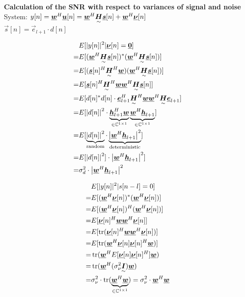 \begin{doublespace}
\textbf{Calculation of the SNR with respect to variances of signal and noise}\\
System: $y[n]=\vec{w}^H\vec{u}[n]=\vec{w}^H\ma{H}\vec{s}[n]+\vec{w}^H\vec{\nu}[n]$\\
\with $\vec{s}[n]=\vec{e}_{l+1}\cdot d[n]$

\parbox{0.5\textwidth}{
\begin{align*}
&E[|y[n]|^2|\vec{\nu}[n]=\vec{0}]\\
=& E[(\vec{w}^H\ma{H}\vec{s}[n])^*(\vec{w}^H\ma{H}\vec{s}[n])]\\
=& E[(\vec{s}[n]^H\ma{H}^H\vec{w})(\vec{w}^H\ma{H}\vec{s}[n])]\\
=& E[\vec{s}[n]^H\ma{H}^H\vec{w}\vec{w}^H\ma{H}\vec{s}[n]]\\
=&E[d[n]^*d[n]\cdot\vec{e}_{l+1}^H\ma{H}^H\vec{w}\vec{w}^H\ma{H}\vec{e}_{l+1}]\\
=&E[\abs{d[n]}^2\cdot\underbrace{\vec{h}_{l+1}^H\vec{w}}_{\in\mathbb{C}^{1\times 1}}\underbrace{\vec{w}^H\vec{h}_{l+1}}_{\in\mathbb{C}^{1\times 1}}]\\
=& E[\underbrace{\abs{d[n]}^2}_{\text{random}}\cdot\underbrace{\abs{\vec{w}^H\vec{h}_{l+1}}^2}_{\text{deterministic}}]\\
=& E[\abs{d[n]}^2]\cdot\abs{\vec{w}^H\vec{h}_{l+1}}^2]\\
=& \sigma_d^2\cdot\abs{\vec{w}^H\vec{h}_{l+1}}^2\\
\end{align*}
}
\parbox{0.5\textwidth}{
\begin{align*}
&E[|y[n]|^2|s[n-l]=0]\\
=&E[(\vec{w}^H\vec{\nu}[n])^*(\vec{w}^H\vec{\nu}[n])]\\
=&E[(\vec{w}^H\vec{\nu}[n])^H(\vec{w}^H\vec{\nu}[n])]\\
=&E[\vec{\nu}[n]^H\vec{w}\vec{w}^H\vec{\nu}[n]]\\
=&E[\tr(\vec{\nu}[n]^H\vec{w}\vec{w}^H\vec{\nu}[n])]\\
=&E[\tr(\vec{w}^H\vec{\nu}[n]\vec{\nu}[n]^H\vec{w})]\\
=&\tr(\vec{w}^H E[\vec{\nu}[n]\vec{\nu}[n]^H]\vec{w})\\
=&\tr(\vec{w}^H(\sigma_\nu^2 \ma{I})\vec{w})\\
=&\sigma_\nu^2\cdot\tr(\underbrace{\vec{w}^H\vec{w}}_{\in\mathbb{C}^{1\times 1}})=\sigma_\nu^2\cdot\vec{w}^H\vec{w}\\
\end{align*}}


\end{doublespace}
